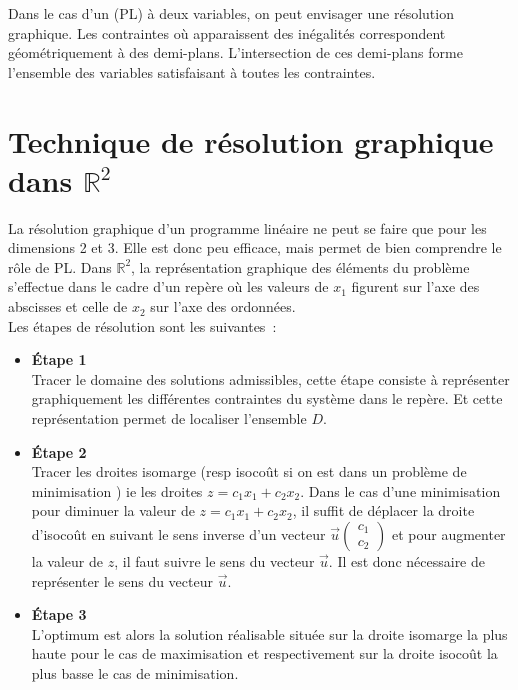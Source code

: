 \documentclass[a4paper,12pt,openany]{book}
\theoremstyle{plain}
\theoremstyle{definition}
\theoremstyle{remark}
\theoremstyle{nbstyle}
\begin{document}
	Dans le cas d'un (PL) à deux variables, on peut envisager une résolution graphique. Les contraintes où apparaissent des inégalités correspondent géométriquement à des demi-plans. L'intersection de ces demi-plans forme l'ensemble des variables satisfaisant à toutes les contraintes.
	
	\section{Technique de résolution graphique dans $\mathbb{R}^{2}$}
	
	La résolution graphique d'un programme linéaire ne peut se faire que pour les dimensions 2 et 3. Elle est donc peu efficace, mais permet de bien comprendre le rôle de PL.
	Dans $\mathbb{R}^{2}$, la  représentation graphique des éléments du problème s'effectue dans le cadre d'un repère où les valeurs de $x_{1}$ figurent sur l'axe des abscisses et celle de $x_{2}$ sur l'axe des ordonnées.\\
	Les étapes de résolution sont les suivantes :
	\begin{itemize}
		\item[$ \diamond $]\textbf{ Étape 1} \\
		Tracer le domaine des solutions admissibles, cette étape consiste à représenter graphiquement les différentes contraintes du système dans le repère. Et cette représentation permet de localiser l'ensemble $ D$.
		\item[$ \diamond $] \textbf{Étape 2} \\
		Tracer les droites isomarge  (resp isocoût si on est dans un problème de minimisation ) ie les droites $z=c_{1}x_{1}+c_{2}x_{2}$.
		Dans le cas d'une minimisation pour diminuer la valeur de $z=c_{1}x_{1}+c_{2}x_{2}$, il suffit de déplacer la droite d'isocoût en suivant le sens inverse d'un vecteur $\overrightarrow{u}\begin{pmatrix}
		c_{1}\\
		c_{2}
		\end{pmatrix}$ et pour augmenter la valeur de $z$, il faut suivre le sens du vecteur $\overrightarrow{u}$. Il est donc nécessaire de représenter le sens du vecteur $\overrightarrow{u}$.
		\item[$ \diamond $] \textbf{Étape 3} \\
		L'optimum est alors la solution réalisable située sur la droite isomarge la plus haute pour le cas de maximisation et respectivement sur la droite isocoût la plus basse le cas de minimisation.
	\end{itemize}
	
\end{document}
